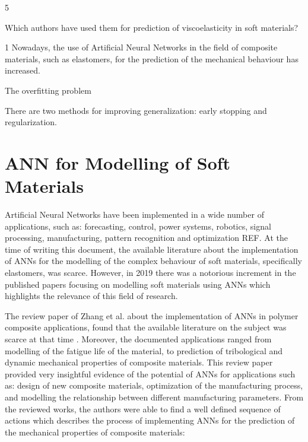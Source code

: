 5

Which authors have used them for prediction of viscoelasticity in soft materials?

1 Nowadays, the use of Artificial Neural Networks in the field of composite materials, such as elastomers, for the prediction of the mechanical behaviour has increased. 

The overfitting problem

There are two methods for improving generalization: early stopping and regularization.

\section{ANN for Modelling of Soft Materials }

Artificial Neural Networks have been implemented in a wide number of applications, such as: forecasting, control, power systems, robotics, signal processing, manufacturing, pattern recognition and optimization REF. At the time of writing this document, the available literature about the implementation of ANNs for the modelling of the complex behaviour of soft materials, specifically elastomers, was scarce. However, in 2019 there was a notorious increment in the published papers focusing on modelling soft materials using ANNs which highlights the relevance of this field of research.

The review paper of Zhang et al. about the implementation of ANNs in polymer composite applications, found that the available literature on the subject was scarce at that time \cite{zhang2003artificial}. Moreover, the documented applications ranged from modelling of the fatigue life of the material, to prediction of tribological and dynamic mechanical properties of composite materials. This review paper provided very insightful evidence of the potential of ANNs for applications such as: design of new composite materials, optimization of the manufacturing process, and modelling the relationship between different manufacturing parameters. From the reviewed works, the authors were able to find a well defined sequence of actions which describes the process of implementing ANNs for the prediction of the mechanical properties of composite materials:

